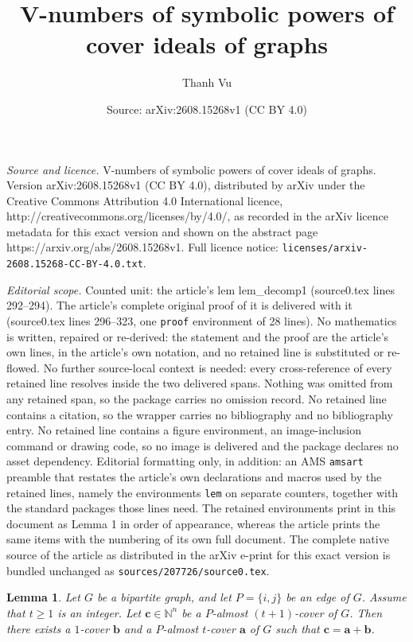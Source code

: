 \documentclass[10pt,a4paper]{amsart}
\title{V-numbers of symbolic powers of cover ideals of graphs}
\author{Thanh Vu}
\date{Source: arXiv:2608.15268v1 (CC BY 4.0)}
\newtheorem{lem}{Lemma}
\begin{document}
\maketitle

\noindent\emph{Source and licence.} V-numbers of symbolic powers of cover ideals of graphs. Version arXiv:2608.15268v1 (CC BY 4.0), distributed by arXiv under the Creative Commons Attribution 4.0 International licence, http://creativecommons.org/licenses/by/4.0/, as recorded in the arXiv licence metadata for this exact version and shown on the abstract page https://arxiv.org/abs/2608.15268v1. Full licence notice: \texttt{licenses/arxiv-2608.15268-CC-BY-4.0.txt}.\par\smallskip

\noindent\textit{Editorial scope.} Counted unit: the article's lem lem\_decomp1 (source0.tex lines 292--294). The article's complete original proof of it is delivered with it (source0.tex lines 296--323, one \texttt{proof} environment of 28 lines). No mathematics is written, repaired or re-derived: the statement and the proof are the article's own lines, in the article's own notation, and no retained line is substituted or re-flowed.  No further source-local context is needed: every cross-reference of every retained line resolves inside the two delivered spans.  Nothing was omitted from any retained span, so the package carries no omission record.  No retained line contains a citation, so the wrapper carries no bibliography and no bibliography entry.  No retained line contains a figure environment, an image-inclusion command or drawing code, so no image is delivered and the package declares no asset dependency.  Editorial formatting only, in addition: an AMS \texttt{amsart} preamble that restates the article's own declarations and macros used by the retained lines, namely the environments \texttt{lem} on separate counters, together with the standard packages those lines need.  The retained environments print in this document as Lemma 1 in order of appearance, whereas the article prints the same items with the numbering of its own full document.  The complete native source of the article as distributed in the arXiv e-print for this exact version is bundled unchanged as \texttt{sources/207726/source0.tex}.
\begin{lem}\label{lem_decomp1} 
Let $G$ be a bipartite graph, and let $P = \{i,j\}$ be an edge of $G$. Assume that $t \ge 1$ is an integer. Let $\mathbf{c} \in \mathbb{N}^n$ be a $P$-almost $(t+1)$-cover of $G$. Then there exists a $1$-cover $\mathbf{b}$ and a $P$-almost $t$-cover $\mathbf{a}$ of $G$ such that $\mathbf{c} = \mathbf{a} + \mathbf{b}$.
\end{lem}
\end{document}
